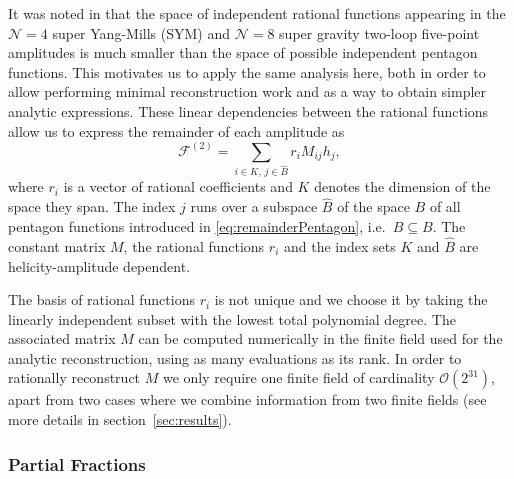 It was noted in \cite{Abreu:2018aqd,Chicherin:2018yne,Abreu:2019rpt,Chicherin:2019xeg} 
that the space of independent rational
functions appearing in the $\mathcal{N}=4$ super Yang-Mills (SYM) and $\mathcal{N}=8$ super gravity
two-loop five-point amplitudes is much smaller than the space of possible independent
pentagon functions. This motivates us to apply the same analysis here, both
in order to allow performing minimal reconstruction work and as a way to obtain
simpler analytic expressions.
These linear dependencies between the rational functions allow us to express the 
remainder of each amplitude as
\begin{equation}
		\mathcal{F}^{(2)} = 
		\sum_{i\in K ,\, j\in \hat B} r_i M_{ij} h_j,
\label{eq:remainderDecomposition}
\end{equation}
where $r_i$ is a vector of rational coefficients and $K$ denotes
the dimension of the space they span.
The index $j$ runs over a subspace $\hat B$ of the space $B$ of all pentagon functions 
introduced in \cref{eq:remainderPentagon}, i.e.\  $\hat B\subseteq B$. 
The constant matrix $M$, the rational functions $r_i$ 
and the index sets $K$ and $\hat B$ are helicity-amplitude dependent.


The basis of rational functions $r_i$ is not unique
and we choose it by taking the linearly independent subset with
the lowest total polynomial degree. The associated matrix $M$
can be computed numerically in the finite field used for the analytic reconstruction,
using as many evaluations as its rank. 
In order to rationally reconstruct $M$ we only
require one finite field of cardinality $\mathcal{O}(2^{31})$, apart from two
cases where we combine information from two finite fields (see more details in 
section~\ref{sec:results}).



\subsubsection{Partial Fractions}
\label{sec:PartialFractions}

